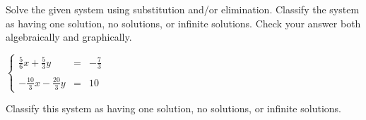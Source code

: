 \documentclass{ximera}
\author{Elizabeth Miller}
\begin{document}
Solve the given system using substitution and/or elimination. Classify the system as having one solution, no solutions, or infinite solutions. Check your answer both algebraically and graphically.

$\left\{ \begin{array}{rcr} \frac{5}{6}x+\frac{5}{3}y & = & -\frac{7}{3}  \\ \\ [5pt] -\frac{10}{3}x-\frac{20}{3}y & = & 10  \end{array} \right.$

\begin{exercise}
Classify this system as having one solution, no solutions, or infinite solutions.
\begin{multipleChoice}  
\end{multipleChoice}  
\end{exercise}
\end{document}
